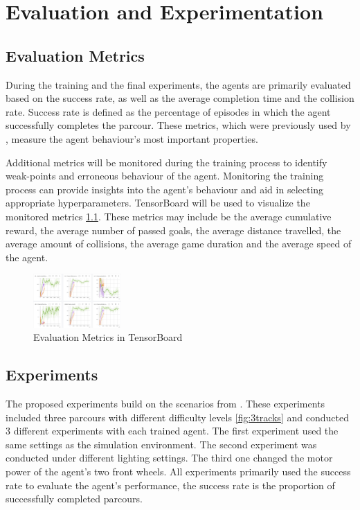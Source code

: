\chapter{Evaluation and Experimentation}

\section{Evaluation Metrics}

During the training and the final experiments, the agents are primarily evaluated based on the success rate, as well as the average completion time and the collision rate. Success rate is defined as the percentage of episodes in which the agent successfully completes the parcour. These metrics, which were previously used by \autocite{maximilian}, measure the agent behaviour's most important properties.

Additional metrics will be monitored during the training process to identify weak-points and erroneous behaviour of the agent. Monitoring the training process can provide insights into the agent's behaviour and aid in selecting appropriate hyperparameters. TensorBoard will be used to visualize the monitored metrics \ref{fig:tensorboard}.
These metrics may include be the average cumulative reward, the average number of passed goals, the average distance travelled, the average amount of collisions, the average game duration and the average speed of the agent.

\begin{figure}
    \centering
    \includegraphics[width=0.3\textwidth]{Bilder/tensorboard2.jpg}
    \caption{Evaluation Metrics in TensorBoard}
    \label{fig:tensorboard}
\end{figure}

\section{Experiments}

The proposed experiments build on the scenarios from \autocite{maximilian}. These experiments included three parcours with different difficulty levels \ref{fig:3tracks} and conducted 3 different experiments with each trained agent. The first experiment used the same settings as the simulation environment. The second experiment was conducted under different lighting settings. The third one changed the motor power of the agent's two front wheels. All experiments primarily used the success rate to evaluate the agent's performance, the success rate is the proportion of successfully completed parcours.

